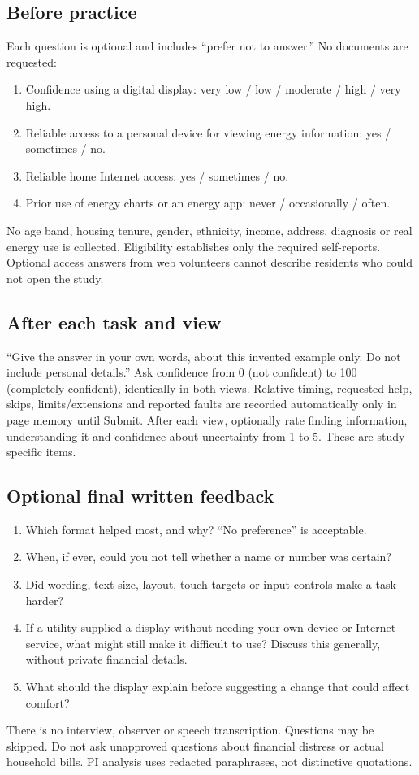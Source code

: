 \documentclass[11pt,letterpaper]{article}
\begin{document}
\subsection*{Before practice}
Each question is optional and includes ``prefer not to answer.'' No documents are requested:
\begin{enumerate}
\item Confidence using a digital display: very low / low / moderate / high / very high.
\item Reliable access to a personal device for viewing energy information: yes / sometimes / no.
\item Reliable home Internet access: yes / sometimes / no.
\item Prior use of energy charts or an energy app: never / occasionally / often.
\end{enumerate}
No age band, housing tenure, gender, ethnicity, income, address, diagnosis or real energy use is collected. Eligibility establishes only the required self-reports. Optional access answers from web volunteers cannot describe residents who could not open the study.

\subsection*{After each task and view}
``Give the answer in your own words, about this invented example only. Do not include personal details.'' Ask confidence from 0 (not confident) to 100 (completely confident), identically in both views. Relative timing, requested help, skips, limits/extensions and reported faults are recorded automatically only in page memory until Submit. After each view, optionally rate finding information, understanding it and confidence about uncertainty from 1 to 5. These are study-specific items.

\subsection*{Optional final written feedback}
\begin{enumerate}
\item Which format helped most, and why? ``No preference'' is acceptable.
\item When, if ever, could you not tell whether a name or number was certain?
\item Did wording, text size, layout, touch targets or input controls make a task harder?
\item If a utility supplied a display without needing your own device or Internet service, what might still make it difficult to use? Discuss this generally, without private financial details.
\item What should the display explain before suggesting a change that could affect comfort?
\end{enumerate}
There is no interview, observer or speech transcription. Questions may be skipped. Do not ask unapproved questions about financial distress or actual household bills. PI analysis uses redacted paraphrases, not distinctive quotations.
\end{document}
